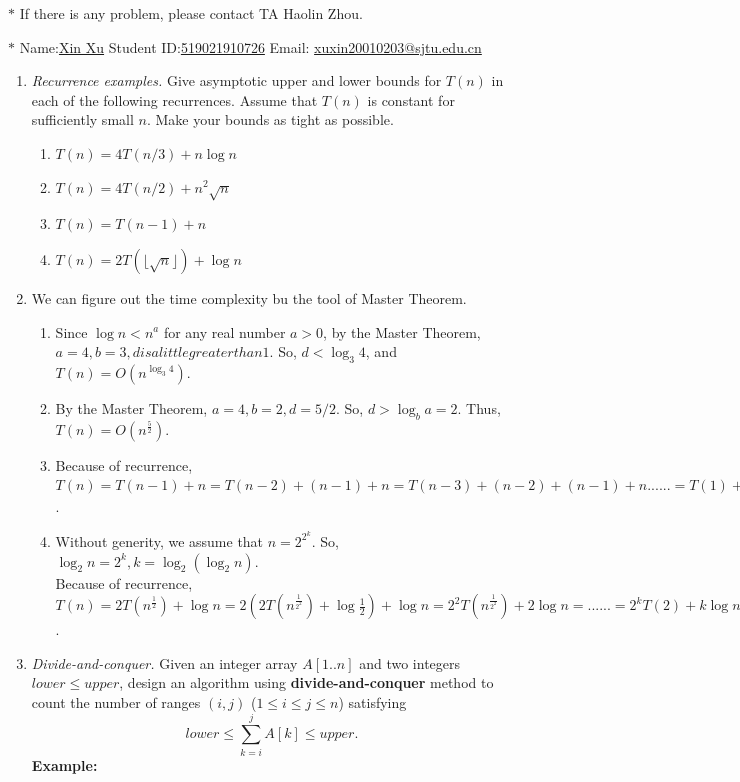 \documentclass[12pt,a4paper]{article}
\makeatletter
\newtheorem*{solution}{Solution}
\theoremstyle{definition}
\renewenvironment{solution}[1][Solution] {\par\pushQED{\qed}\normalfont\topsep6\p@\@plus6\p@\relax\trivlist\item[\hskip\labelsep\bfseries#1\@addpunct{.}]\ignorespaces}{\popQED\endtrivlist\@endpefalse} \makeatother
\makeatother
\begin{document}
\noindent

\noindent{}
\begin{center}
\footnotesize{\color{red}$*$ If there is any problem, please contact TA Haolin Zhou. }

\footnotesize{\color{blue}$*$ Name:\underline{Xin Xu}  \quad Student ID:\underline{519021910726} \quad Email: \underline{xuxin20010203@sjtu.edu.cn}}
\end{center}

\begin{enumerate}
\item
    \textit{Recurrence examples.} Give asymptotic upper and lower bounds for $T(n)$ in each of the following recurrences. Assume that $T(n)$ is constant for sufficiently small $n$. Make your bounds as tight as possible.
\begin{enumerate}
	\item $T(n)=4 T(n / 3)+n \log n$
	\item $T(n)=4 T(n / 2)+n^{2} \sqrt{n}$
	\item $T(n)=T(n-1)+n$	
	\item $T(n)=2T(\lfloor \sqrt n\rfloor)+\log n$
\end{enumerate}
\begin{solution}
    We can figure out the time complexity bu the tool of Master Theorem.
	\begin{enumerate}
        \item Since $\log n < n^a$ for any real number $a>0$, by the Master Theorem, $a=4,b=3,d is a little greater than 1$. So, $d< \log_3 4$, and $T(n)=O (n^{\log_3 4})$.
        \item By the Master Theorem, $a=4, b=2, d=5/2$. So, $d>\log_b a=2$. Thus, $T(n)=O (n^{\frac{5}{2}} )$.
        \item Because of recurrence, $T(n)=T(n-1)+n=T(n-2)+(n-1)+n=T(n-3)+(n-2)+(n-1)+n......=T(1)+2+3+...+(n-2)+(n-1)+n=O(n^2)$.
        \item Without generity, we assume that $n=2^{2^k}$. So, $\log_2 n=2^k,k=\log_2 (\log_2 n)$.
              \\Because of recurrence, $T(n)=2T(n^\frac{1}{2})+\log n=2(2T(n^{\frac{1}{2^2}})+\log \frac{1}{2})+\log n=2^2T(n^\frac{1}{2^2})+2\log n=......=2^kT(2)+k\log n=A\log n+B \log n*\log (\log n)=O(\log n\log (\log n))$.
    \end{enumerate}
\end{solution}
\item
\textit{Divide-and-conquer.} Given an integer array $A[1..n]$ and two integers $lower \le upper$, design an algorithm using \textbf{divide-and-conquer} method to count the number of ranges $(i,j)$ ($1 \leq i \leq j \leq n$) satisfying
$$
    lower \leq \sum_{k=i}^{j}{A[k]} \leq upper.
$$
\textbf{Example:}


\end{enumerate}
\end{document}
